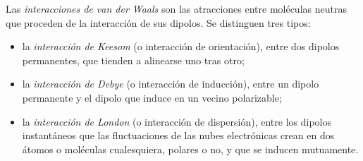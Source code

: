 \begin{definition}\label{def:b1:intermolecular-forces-solvents:vdw}
Las \emph{interacciones de van der Waals}
son las atracciones entre moléculas neutras que proceden de la
interacción de sus dipolos. Se distinguen tres tipos:
\begin{itemize}
  \item la \emph{interacción de Keesom} (o
        interacción de orientación), entre dos dipolos permanentes, que
        tienden a alinearse uno tras otro;
  \item la \emph{interacción de Debye} (o
        interacción de inducción), entre un dipolo permanente y el dipolo
        que induce en un vecino polarizable;
  \item la \emph{interacción de London} (o
        interacción de dispersión), entre los dipolos instantáneos que
        las fluctuaciones de las nubes electrónicas crean en dos átomos o
        moléculas cualesquiera, polares o no, y que se inducen
        mutuamente.
\end{itemize}
\end{definition}

